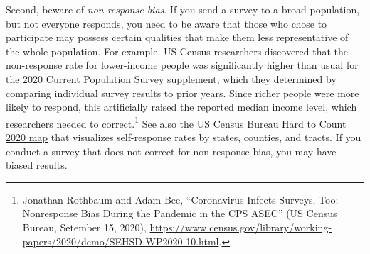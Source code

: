 \documentclass[
  english,
]{book}
\begin{document}
Second, beware of \emph{non-response bias}. If you send a survey to a broad population, but not everyone responds, you need to be aware that those who chose to participate may possess certain qualities that make them less representative of the whole population. For example, US Census researchers discovered that the non-response rate for lower-income people was significantly higher than usual for the 2020 Current Population Survey supplement, which they determined by comparing individual survey results to prior years. Since richer people were more likely to respond, this artificially raised the reported median income level, which researchers needed to correct.\footnote{Jonathan Rothbaum and Adam Bee, {``Coronavirus {Infects Surveys}, {Too}: {Nonresponse Bias During} the {Pandemic} in the {CPS ASEC}''} ({US Census Bureau}, Setember 15, 2020), \url{https://www.census.gov/library/working-papers/2020/demo/SEHSD-WP2020-10.html}.} See also the \href{https://www.censushardtocountmaps2020.us}{US Census Bureau Hard to Count 2020 map} that visualizes self-response rates by states, counties, and tracts. If you conduct a survey that does not correct for non-response bias, you may have biased results.
\end{document}

